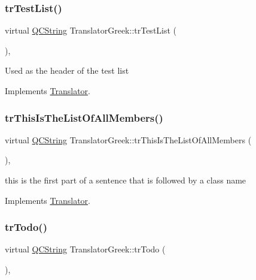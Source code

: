 \subsubsection{\texorpdfstring{trTestList()}{trTestList()}}
{\footnotesize\ttfamily virtual \mbox{\hyperlink{class_q_c_string}{Q\+C\+String}} Translator\+Greek\+::tr\+Test\+List (\begin{DoxyParamCaption}{ }\end{DoxyParamCaption})\hspace{0.3cm}{\ttfamily [inline]}, {\ttfamily [virtual]}}

Used as the header of the test list 

Implements \mbox{\hyperlink{class_translator}{Translator}}.

\mbox{\label{class_translator_greek_a545216f64dd38c43e5f53da7185c24f6}} 
\subsubsection{\texorpdfstring{trThisIsTheListOfAllMembers()}{trThisIsTheListOfAllMembers()}}
{\footnotesize\ttfamily virtual \mbox{\hyperlink{class_q_c_string}{Q\+C\+String}} Translator\+Greek\+::tr\+This\+Is\+The\+List\+Of\+All\+Members (\begin{DoxyParamCaption}{ }\end{DoxyParamCaption})\hspace{0.3cm}{\ttfamily [inline]}, {\ttfamily [virtual]}}

this is the first part of a sentence that is followed by a class name 

Implements \mbox{\hyperlink{class_translator}{Translator}}.

\mbox{\label{class_translator_greek_a7ecac9d464c292ef422ddb4daec87508}} 
\subsubsection{\texorpdfstring{trTodo()}{trTodo()}}
{\footnotesize\ttfamily virtual \mbox{\hyperlink{class_q_c_string}{Q\+C\+String}} Translator\+Greek\+::tr\+Todo (\begin{DoxyParamCaption}{ }\end{DoxyParamCaption})\hspace{0.3cm}{\ttfamily [inline]}, {\ttfamily [virtual]}}

